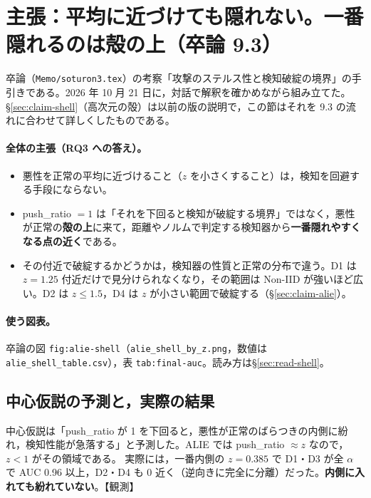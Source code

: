 \documentclass[a4j, dvipdfmx]{jsarticle}  %
\begin{document}
\section{主張：平均に近づけても隠れない。一番隠れるのは殻の上（卒論 9.3）}
\label{sec:claim-rq3}

卒論（\texttt{Memo/soturon3.tex}）の考察「攻撃のステルス性と検知破綻の境界」の手引きである。2026 年 10 月 21 日に，対話で解釈を確かめながら組み立てた。
\S\ref{sec:claim-shell}（高次元の殻）は以前の版の説明で，この節はそれを 9.3 の流れに合わせて詳しくしたものである。

\paragraph{全体の主張（RQ3 への答え）。}
\begin{itemize}
  \item 悪性を正常の平均に近づけること（$z$ を小さくすること）は，検知を回避する手段にならない。
  \item push\_ratio $= 1$ は「それを下回ると検知が破綻する境界」ではなく，悪性が正常の\textbf{殻の上}に来て，距離やノルムで判定する検知器から\textbf{一番隠れやすくなる点の近く}である。
  \item その付近で破綻するかどうかは，検知器の性質と正常の分布で違う。D1 は $z = 1.25$ 付近だけで見分けられなくなり，その範囲は Non-IID が強いほど広い。D2 は $z \le 1.5$，D4 は $z$ が小さい範囲で破綻する（\S\ref{sec:claim-alie}）。
\end{itemize}

\paragraph{使う図表。}
卒論の図 \texttt{fig:alie-shell}（\texttt{alie\_shell\_by\_z.png}，数値は \texttt{alie\_shell\_table.csv}），表 \texttt{tab:final-auc}。読み方は\S\ref{sec:read-shell}。

\subsection{中心仮説の予測と，実際の結果}

中心仮説は「push\_ratio が 1 を下回ると，悪性が正常のばらつきの内側に紛れ，検知性能が急落する」と予測した。ALIE では push\_ratio $\approx z$ なので，$z < 1$ がその領域である。
実際には，一番内側の $z = 0.385$ で D1・D3 が全 $\alpha$ で AUC 0.96 以上，D2・D4 も 0 近く（逆向きに完全に分離）だった。\textbf{内側に入れても紛れていない}。【観測】
\end{document}
